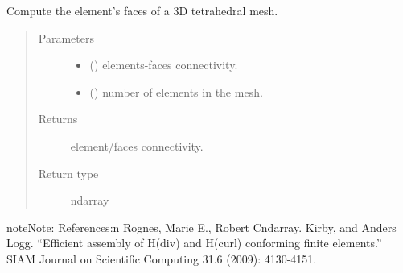 \documentclass[letterpaper,10pt,english]{sphinxmanual}
\begin{document}
\begin{fulllineitems}
\label{\detokenize{petgem/mesh:petgem.mesh.computeFaces}}
Compute the element’s faces of a 3D tetrahedral mesh.
\begin{quote}\begin{description}
\item[{Parameters}] \leavevmode\begin{itemize}
\item {} 
 () \textendash{} elements-faces connectivity.

\item {} 
 () \textendash{} number of elements in the mesh.

\end{itemize}

\item[{Returns}] \leavevmode
element/faces connectivity.

\item[{Return type}] \leavevmode
ndarray

\end{description}\end{quote}

\begin{sphinxadmonition}{note}{Note:}
References:n
Rognes, Marie E., Robert Cndarray. Kirby, and Anders Logg. “Efficient
assembly of H(div) and H(curl) conforming finite elements.”
SIAM Journal on Scientific Computing 31.6 (2009): 4130-4151.
\end{sphinxadmonition}

\end{fulllineitems}

\end{document}
